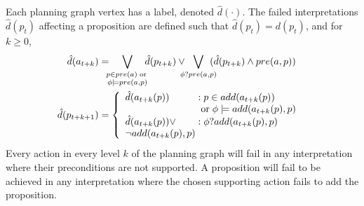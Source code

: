 \documentclass[letterpaper]{article}
\begin{document}
 Each planning graph vertex has a label, denoted $\hat{d}(\cdot)$.  The failed
 interpretations $\hat{d}(p_t) $ affecting a proposition are defined such that
 $\hat{d}(p_t) = d(p_t)$, and for $k \geq 0$,
\begin{align}
\hat{d}({a}_{t+k}) &= \hspace*{-.2cm}
\bigvee\limits_{\substack{p \in pre({a}) \;\text{or}\;\\ \phi\models
pre(a, p) }} \hspace*{-.2cm}
\hat{d}(p_{t+k}) \vee \hspace*{-.25cm} \bigvee\limits_{\phi?pre(a, p)}
\hspace*{-.25cm} (\hat{d}(p_{t+k})  \wedge pre({a}, p) )\notag\\ \notag
\hspace*{-.6cm} \hat{d}(p_{t+k+1}) &= \left\{\begin{array}{l@{\;}l@{\;}r}
\hat{d}({a}_{t+k}(p)) & : p \in add(a_{t+k}(p))\\ & \;\text{or}\; \phi\models
add(a_{t+k}(p), p)\\
\hat{d}(a_{t+k}(p)) \vee& : \phi?add(a_{t+k}(p), p)\\
\neg add(a_{t+k}(p), p)
\end{array}\right. \hspace*{-.1cm}\label{eqn:hprop}
\end{align}
Every action in every level $k$ of the planning graph will fail in any
interpretation where their preconditions are not supported.  A proposition will
fail  to be achieved in any interpretation where the chosen supporting action
fails to add the proposition.

\end{document}
